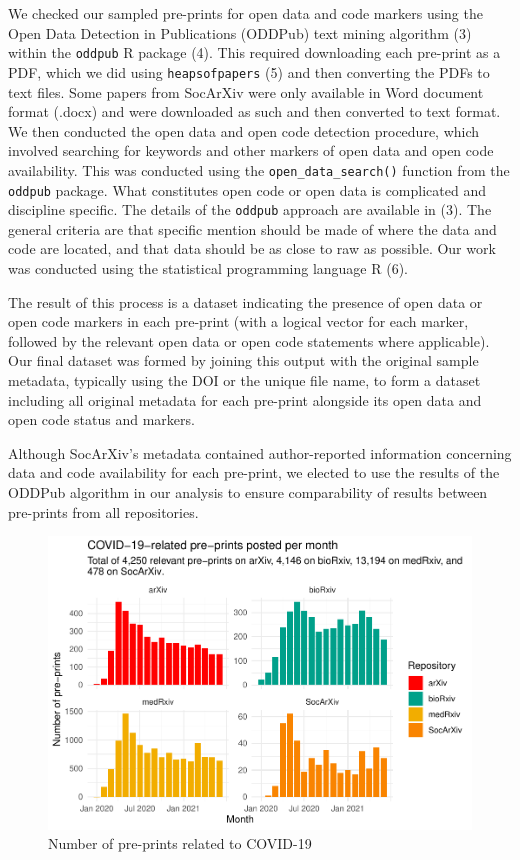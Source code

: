 \documentclass[
]{article}
\begin{document}
We checked our sampled pre-prints for open data and code markers using the Open Data Detection in Publications (ODDPub) text mining algorithm (3) within the \texttt{oddpub} R package (4). This required downloading each pre-print as a PDF, which we did using \texttt{heapsofpapers} (5) and then converting the PDFs to text files. Some papers from SocArXiv were only available in Word document format (.docx) and were downloaded as such and then converted to text format. We then conducted the open data and open code detection procedure, which involved searching for keywords and other markers of open data and open code availability. This was conducted using the \texttt{open\_data\_search()} function from the \texttt{oddpub} package. What constitutes open code or open data is complicated and discipline specific. The details of the \texttt{oddpub} approach are available in (3). The general criteria are that specific mention should be made of where the data and code are located, and that data should be as close to raw as possible. Our work was conducted using the statistical programming language R (6).

The result of this process is a dataset indicating the presence of open data or open code markers in each pre-print (with a logical vector for each marker, followed by the relevant open data or open code statements where applicable). Our final dataset was formed by joining this output with the original sample metadata, typically using the DOI or the unique file name, to form a dataset including all original metadata for each pre-print alongside its open data and open code status and markers.

Although SocArXiv's metadata contained author-reported information concerning data and code availability for each pre-print, we elected to use the results of the ODDPub algorithm in our analysis to ensure comparability of results between pre-prints from all repositories.

\begin{figure}

{\centering \includegraphics[width=0.9\linewidth]{paper_files/figure-latex/monthly-papers-total-1} 

}

\caption{Number of pre-prints related to COVID-19}\label{fig:monthly-papers-total}
\end{figure}
\end{document}

